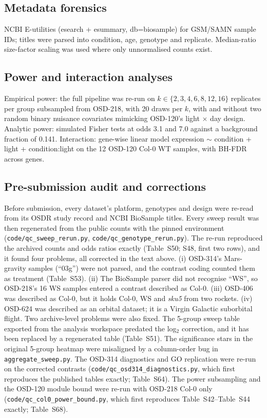\documentclass[11pt,a4paper]{article}
\newcommand{\Sx}[1]{Table~S#1}
\begin{document}
\subsection*{Metadata forensics}
NCBI E-utilities (esearch + esummary, db=biosample) for GSM/SAMN sample IDs; titles were parsed
into condition, age, genotype and replicate. Median-ratio size-factor scaling was used where
only unnormalised counts exist.

\subsection*{Power and interaction analyses}
Empirical power: the full pipeline was re-run on $k\in\{2,3,4,6,8,12,16\}$ replicates per group subsampled
from OSD-218, with 20 draws per $k$, with and without two random binary nuisance covariates
mimicking OSD-120's light $\times$ day design. Analytic power: simulated Fisher tests at
odds 3.1 and 7.0 against a background fraction of 0.141. Interaction: gene-wise linear model
expression $\sim$ condition + light + condition:light on the 12 OSD-120 Col-0 WT samples,
with BH-FDR across genes.

\subsection*{Pre-submission audit and corrections}
Before submission, every dataset's platform, genotypes and design were re-read from its OSDR study record and
NCBI BioSample titles. Every sweep result was then regenerated from the public counts with the pinned
environment (\texttt{code/qc\_sweep\_rerun.py}, \texttt{code/qc\_genotype\_rerun.py}). The re-run reproduced the
archived counts and odds ratios exactly (\Sx{50}; S48, first two rows), and it found four problems, all
corrected in the text above.
(i) OSD-314's Mars-gravity samples (``03g'') were not parsed, and the contrast coding counted them as
treatment (Table~S53).
(ii) The BioSample parser did not recognise ``WS'', so OSD-218's 16 WS samples entered a contrast described as
Col-0.
(iii) OSD-406 was described as Col-0, but it holds Col-0, WS and \textit{sku5} from two rockets.
(iv) OSD-624 was described as an orbital dataset; it is a Virgin Galactic suborbital flight.
Two archive-level problems were also fixed. The 5-group sweep table exported from the analysis workspace
predated the log$_2$ correction, and it has been replaced by a regenerated table (\Sx{51}). The significance stars
in the original 5-group heatmap were misaligned by a column-order bug in \texttt{aggregate\_sweep.py}.
The OSD-314 diagnostics and GO replication were re-run on the corrected contrasts
(\texttt{code/qc\_osd314\_diagnostics.py}, which first reproduces the published tables exactly; \Sx{64}). The power
subsampling and the OSD-120 module bound were re-run with OSD-218 Col-0 only (\texttt{code/qc\_col0\_power\_bound.py},
which first reproduces \Sx{42}--\Sx{44} exactly; \Sx{68}).
\end{document}
